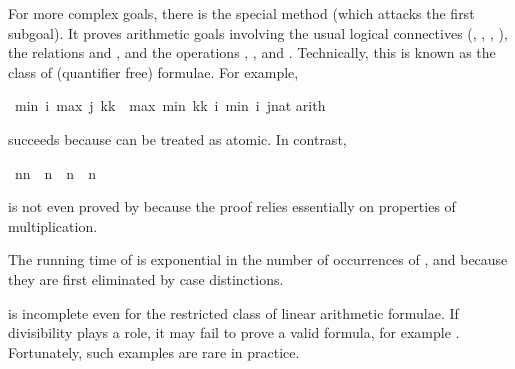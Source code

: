 \begin{isabellebody}
\begin{isamarkuptext}
For more complex goals, there is the special method 
(which attacks the first subgoal). It proves arithmetic goals involving the
usual logical connectives (\isa{{\isasymnot}}, \isa{{\isasymand}}, \isa{{\isasymor}},
\isa{{\isasymlongrightarrow}}), the relations \isa{{\isasymle}} and \isa{{\isacharless}}, and the operations
\isa{{\isacharplus}}, \isa{{\isacharminus}},  and . Technically, this is
known as the class of (quantifier free)  formulae.
For example,%
\end{isamarkuptext}%
\ {\isachardoublequote}min\ i\ {\isacharparenleft}max\ j\ {\isacharparenleft}k{\isacharasterisk}k{\isacharparenright}{\isacharparenright}\ {\isacharequal}\ max\ {\isacharparenleft}min\ {\isacharparenleft}k{\isacharasterisk}k{\isacharparenright}\ i{\isacharparenright}\ {\isacharparenleft}min\ i\ {\isacharparenleft}j{\isacharcolon}{\isacharcolon}nat{\isacharparenright}{\isacharparenright}{\isachardoublequote}\isanewline
{}arith{\isacharparenright}%
\begin{isamarkuptext}%
\noindent
succeeds because  can be treated as atomic. In contrast,%
\end{isamarkuptext}%
\ {\isachardoublequote}n{\isacharasterisk}n\ {\isacharequal}\ n\ {\isasymLongrightarrow}\ n{\isacharequal}{}\ {\isasymor}\ n{\isacharequal}{}{\isachardoublequote}%
\begin{isamarkuptext}%
\noindent
is not even proved by  because the proof relies essentially
on properties of multiplication.

\begin{warn}
  The running time of  is exponential in the number of occurrences
  of ,  and
   because they are first eliminated by case distinctions.

   is incomplete even for the restricted class of
  linear arithmetic formulae. If divisibility plays a
  role, it may fail to prove a valid formula, for example
  . Fortunately, such examples are rare in practice.
\end{warn}%
\end{isamarkuptext}%
\end{isabellebody}%
